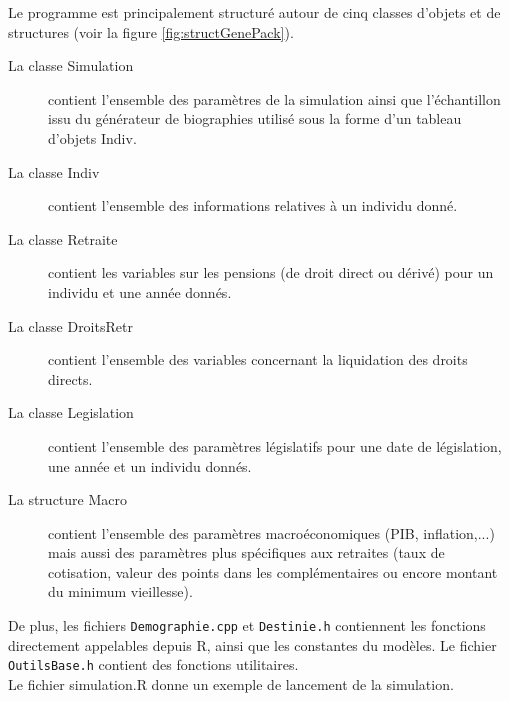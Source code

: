 Le programme est principalement structuré autour de cinq classes d'objets et de structures (voir la figure \ref{fig:structGenePack}).\\
\begin{description}
\item[La classe Simulation] contient l'ensemble des paramètres de la simulation ainsi que 
l'échantillon issu du générateur de biographies
utilisé sous la forme d'un tableau d'objets Indiv.
\item[La classe Indiv] contient l'ensemble des informations relatives à un individu donné.
\item[La classe Retraite] contient les variables sur les pensions (de droit direct ou dérivé) 
pour un individu et une année donnés.
\item[La classe DroitsRetr] contient l'ensemble des variables concernant la liquidation des
droits directs.
\item[La classe Legislation] contient l'ensemble des paramètres législatifs pour une date de législation, une année et un individu donnés. 
\item[La structure Macro] contient l'ensemble des paramètres macroéconomiques (PIB, inflation,...) mais aussi des 
paramètres plus spécifiques aux retraites (taux de cotisation, valeur des points dans les complémentaires ou encore montant du minimum vieillesse).
\end{description}

De plus, les fichiers {\tt Demographie.cpp}  et {\tt Destinie.h} contiennent les fonctions directement appelables depuis R,
ainsi que les constantes du modèles.
Le fichier {\tt OutilsBase.h} contient des fonctions utilitaires.\\

Le fichier simulation.R donne un exemple de lancement de la simulation.



\phantom{sdfgsdgf
sdfgsdg}

\medskip 

